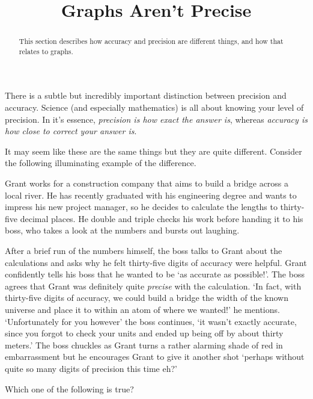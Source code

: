\documentclass{ximeraXloud}
\title{Graphs Aren't Precise}
\begin{document}
\begin{abstract}
    This section describes how accuracy and precision are different things, and how that relates to graphs.
\end{abstract}
\maketitle

    There is a subtle but incredibly important distinction between precision and accuracy. Science (and especially mathematics) is all about knowing your level of precision. In it's essence, \textit{precision is how exact the answer is}, whereas \textit{accuracy is how close to correct your answer is}.
    
    It may seem like these are the same things but they are quite different. Consider the following illuminating example of the difference.
    
    \begin{explanation}%
        Grant works for a construction company that aims to build a bridge across a local river. He has recently graduated with his engineering degree and wants to impress his new project manager, so he decides to calculate the lengths to thirty-five decimal places. He double and triple checks his work before handing it to his boss, who takes a look at the numbers and bursts out laughing.
        
        After a brief run of the numbers himself, the boss talks to Grant about the calculations and asks why he felt thirty-five digits of accuracy were helpful. Grant confidently tells his boss that he wanted to be `as accurate as possible!'. The boss agrees that Grant was definitely quite \textit{precise} with the calculation. `In fact, with thirty-five digits of accuracy, we could build a bridge the width of the known universe and place it to within an atom of where we wanted!' he mentions. `Unfortunately for you however' the boss continues, `it wasn't exactly accurate, since you forgot to check your units and ended up being off by about thirty meters.' The boss chuckles as Grant turns a rather alarming shade of red in embarrassment but he encourages Grant to give it another shot `perhaps without quite so many digits of precision this time eh?'   
    \end{explanation}
    

\begin{question}
    Which one of the following is true?
    \begin{multipleChoice}
    \end{multipleChoice}
\end{question}
\end{document}
